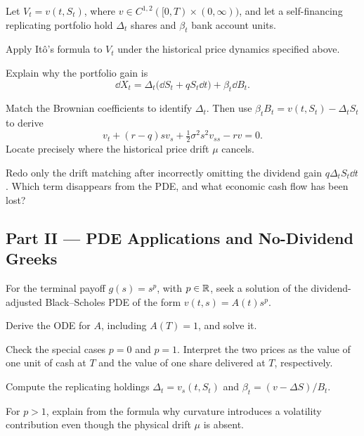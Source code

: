 \begin{exercise}
Let \(V_t=v(t,S_t)\), where
\(v\in C^{1,2}([0,T)\times(0,\infty))\), and let a self-financing
replicating portfolio hold \(\Delta_t\) shares and \(\beta_t\) bank
account units.
\begin{exparts}
  \item Apply It\^o's formula to \(V_t\) under the historical price dynamics
  specified above.
  \item Explain why the portfolio gain is
  \[
  \dd X_t
  =\Delta_t\bigl(\dd S_t+qS_t\dd t\bigr)+\beta_t\dd B_t.
  \]
  \item Match the Brownian coefficients to identify \(\Delta_t\). Then
  use \(\beta_tB_t=v(t,S_t)-\Delta_tS_t\) to derive
  \[
  \boxed{v_t+(r-q)s v_s+\tfrac12\sigma^2s^2v_{ss}-rv=0.}
  \]
  Locate precisely where the historical price drift \(\mu\)
  cancels.
  \item Redo only the drift matching after incorrectly omitting the dividend
  gain \(q\Delta_tS_t\dd t\). Which term disappears from the PDE, and
  what economic cash flow has been lost?
\end{exparts}
\end{exercise}

\clearpage
\subsection*{Part II --- PDE Applications and No-Dividend Greeks}

\begin{exercise}
For the terminal payoff \(g(s)=s^p\), with \(p\in\mathbb{R}\), seek a solution
of the dividend-adjusted Black--Scholes PDE of the form
\(v(t,s)=A(t)s^p\).
\begin{exparts}
  \item Derive the ODE for \(A\), including \(A(T)=1\), and solve it.
  \item Check the special cases \(p=0\) and \(p=1\). Interpret the two
  prices as the value of one unit of cash at \(T\) and the value of one
  share delivered at \(T\), respectively.
  \item Compute the replicating holdings
  \(\Delta_t=v_s(t,S_t)\) and
  \(\beta_t=(v-\Delta S)/B_t\).
  \item For \(p>1\), explain from the formula why curvature introduces a
  volatility contribution even though the physical drift \(\mu\) is
  absent.
\end{exparts}
\end{exercise}

